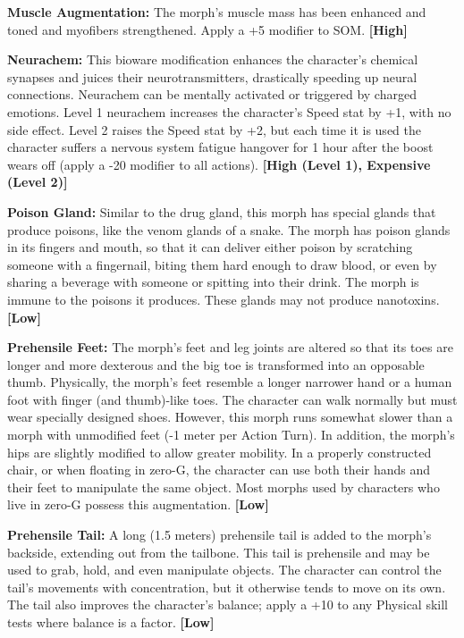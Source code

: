 \textbf{Muscle Augmentation:} The morph’s muscle mass has been enhanced and toned and myofibers strengthened. Apply a +5 modifier to SOM. \textbf{[High]}

\textbf{Neurachem:} This bioware modification enhances the character’s chemical synapses and juices their neurotransmitters, drastically speeding up neural connections. Neurachem can be mentally activated or triggered by charged emotions. Level 1 neurachem increases the character’s Speed stat by +1, with no side effect. Level 2 raises the Speed stat by +2, but each time it is used the character suffers a nervous system fatigue hangover for 1 hour after the boost wears off (apply a -20 modifier to all actions). \textbf{[High (Level 1), Expensive (Level 2)]}

\textbf{Poison Gland:} Similar to the drug gland, this morph has special glands that produce poisons, like the venom glands of a snake. The morph has poison glands in its fingers and mouth, so that it can deliver either poison by scratching someone with a fingernail, biting them hard enough to draw blood, or even by sharing a beverage with someone or spitting into their drink. The morph is immune to the poisons it produces. These glands may not produce nanotoxins. \textbf{[Low]}

\textbf{Prehensile Feet:} The morph’s feet and leg joints are altered so that its toes are longer and more dexterous and the big toe is transformed into an opposable thumb. Physically, the morph’s feet resemble a longer narrower hand or a human foot with finger (and thumb)-like toes. The character can walk normally but must wear specially designed shoes. However, this morph runs somewhat slower than a morph with unmodified feet (-1 meter per Action Turn). In addition, the morph’s hips are slightly modified to allow greater mobility. In a properly constructed chair, or when floating in zero-G, the character can use both their hands and their feet to manipulate the same object. Most morphs used by characters who live in zero-G possess this augmentation. \textbf{[Low]}

\textbf{Prehensile Tail:} A long (1.5 meters) prehensile tail is added to the morph’s backside, extending out from the tailbone. This tail is prehensile and may be used to grab, hold, and even manipulate objects. The character can control the tail’s movements with concentration, but it otherwise tends to move on its own. The tail also improves the character’s balance; apply a +10 to any Physical skill tests where balance is a factor. \textbf{[Low]}


